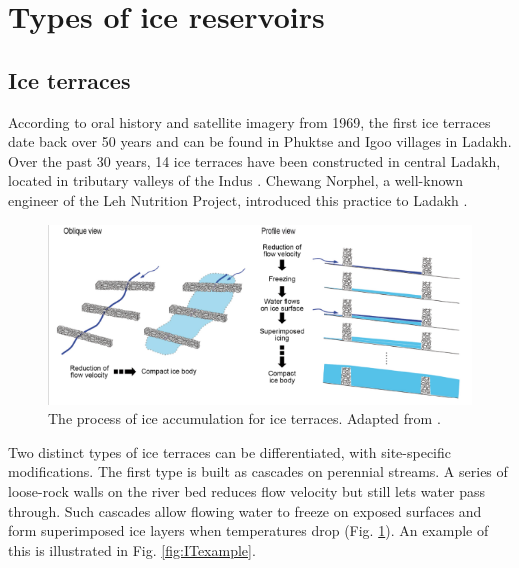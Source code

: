 
\section{Types of ice reservoirs}

\subsection{Ice terraces}

According to oral history and satellite imagery from 1969, the first ice terraces date back over 50 years and can
be found in Phuktse and Igoo villages in Ladakh. Over the past 30 years, 14 ice terraces have been constructed in central Ladakh,
located in tributary valleys of the Indus \citep{norphelArtificialGlacierHigh2009,
	nusserSociohydrologyArtificialGlaciers2019}. Chewang Norphel, a well-known engineer of the Leh Nutrition
Project, introduced this practice to Ladakh \citep{vinceGlacierMan2009}.

\begin{figure}[htb]
	\centering
	\includegraphics[width=\textwidth]{figs/IT_science.png}

	\caption{ The process of ice accumulation for ice terraces. Adapted from
		\citet{nusserSociohydrologyArtificialGlaciers2019}.}

	\label{fig:ITscience}
\end{figure}

Two distinct types of ice terraces can be differentiated, with site-specific modifications. The first type is built as cascades on perennial streams. A series of loose-rock walls on
the river bed reduces flow velocity but still lets water pass through. Such cascades allow flowing water to
freeze on exposed surfaces and form superimposed ice layers when temperatures drop (Fig.
\ref{fig:ITscience}). An example of this is illustrated in Fig. \ref{fig:ITexample}.

